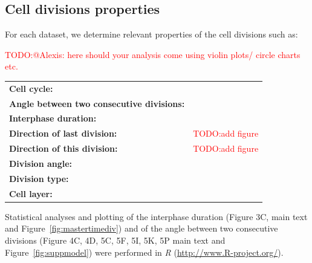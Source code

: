 \documentclass[11pt,a4paper, final]{article}
\newcommand{\TODO}[1]{
\textcolor{red}{TODO:#1}
}
\begin{document}
\subsection{Cell divisions properties}
For each dataset, we determine relevant properties of the cell divisions such as:
\TODO{@Alexis: here should your analysis come using violin plots/ circle charts etc.}

\noindent
\begin{tabularx}{\textwidth}{@{} >{\RaggedRight}p{4.5cm} X @{}}
\textbf{Cell cycle:} &
\\
\textbf{Angle between two consecutive divisions: }&
\\
\textbf{Interphase duration:}&
\\
\textbf{Direction of last division:} &
\TODO{add figure}\\
\textbf{Direction of this division:} &
\TODO{add figure}\\
\textbf{Division angle:} &
\\
\textbf{Division type:} &
\\
\textbf{Cell layer:} &
\\
\end{tabularx}
Statistical analyses and plotting of the interphase duration (Figure 3C, main text and Figure~\ref{fig:mastertimediv}) and of the angle between two consecutive divisions (Figure 4C, 4D, 5C, 5F, 5I, 5K, 5P main text and Figure~\ref{fig:suppmodel}) were performed in \textit{R} (\href{http://www.R-project.org/}{http://www.R-project.org/}).


\clearpage
\end{document}
